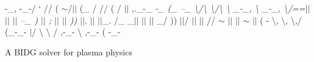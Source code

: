


\begin{DoxyItemize}
\item -\/\+\_\+, -\/\+\_\+-\// ` // ( $\sim$/$\vert$$\vert$ (\+\_\+ / // \textquotesingle{} ( / $\vert$$\vert$ ,.\+\_\+-\/\+\_\+ {\itshape -\/\+\_\+ (\+\_\+ --\+\_\+ \textquotesingle{}\textbackslash{}/\textbackslash{} \textbackslash{}/\textbackslash{} \textbackslash{} \+\_\+-\/\+\_\+, \textbackslash{} \+\_\+-\/\+\_\+, \textbackslash{}/==$\vert$$\vert$ $\vert$$\vert$ $\vert$$\vert$ --\+\_\+ ) $\vert$$\vert$ ;\textquotesingle{} $\vert$$\vert$ $\vert$$\vert$ )) $\vert$$\vert$}. $\vert$$\vert$ $\vert$$\vert$\+\_\+. /\+\_\+ \+\_\+$\vert$$\vert$ $\vert$$\vert$ $\vert$$\vert$ \+\_\+/ )) $\vert$$\vert$/ $\vert$$\vert$ $\vert$$\vert$ // $\sim$ $\vert$$\vert$ $\vert$$\vert$ $\sim$ $\vert$$\vert$ ( -\/ \textbackslash{}, \textbackslash{}, \textbackslash{},/ (\+\_\+-\/\+\_\+-\/ $\vert$/ \textbackslash{} \textbackslash{} /\textquotesingle{} ,-\/\+\_\+-\/ \textbackslash{} ,-\/\+\_\+-\/ ( -\/\+\_\+-\/ 


\end{DoxyItemize}

A B\+I\+DG solver for plasma physics 